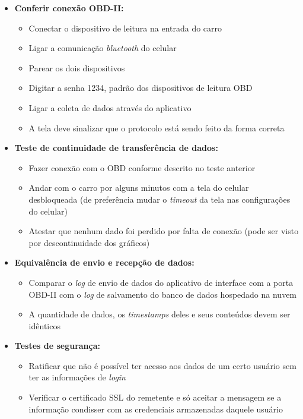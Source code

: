 \begin{itemize}
    \item \textbf{Conferir conexão OBD-II:} 
    
    \begin{itemize}
        \item Conectar o dispositivo de leitura na entrada do carro
        \item Ligar a comunicação \textit{bluetooth} do celular
        \item Parear os dois dispositivos
        \item Digitar a senha 1234, padrão dos dispositivos de leitura OBD
        \item Ligar a coleta de dados através do aplicativo
        \item A tela deve sinalizar que o protocolo está sendo feito da forma correta
    \end{itemize}
    
    \item \textbf{Teste de continuidade de transferência de dados:} 
    \begin{itemize}
        \item Fazer conexão com o OBD conforme descrito no teste anterior
        \item Andar com o carro por alguns minutos com a tela do celular desbloqueada (de preferência mudar o \textit{timeout} da tela nas configurações do celular)
        \item Atestar que nenhum dado foi perdido por falta de conexão (pode ser visto por descontinuidade dos gráficos)
    \end{itemize}
    
    \item \textbf{Equivalência de envio e recepção de dados:}
    \begin{itemize}
        \item Comparar o \textit{log} de envio de dados do aplicativo de interface com a porta OBD-II com o \textit{log} de salvamento do banco de dados hospedado na nuvem
        \item A quantidade de dados, os \textit{timestamps} deles e seus conteúdos devem ser idênticos
    \end{itemize}
    
    \item \textbf{Testes de segurança:} 
    \begin{itemize}
        \item Ratificar que não é possível ter acesso aos dados de um certo usuário sem ter as informações de \textit{login}
        \item Verificar o certificado SSL do remetente e só aceitar a mensagem se a informação condisser com as credenciais armazenadas daquele usuário
    \end{itemize}
    

\end{itemize}
